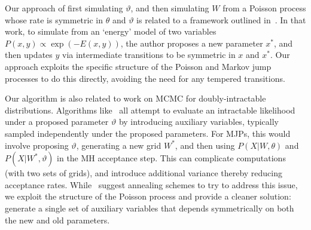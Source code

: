 Our approach of first simulating $\vartheta$, and then simulating $W$ from a Poisson process whose rate is symmetric in $\theta$ and $\vartheta$ is related to a framework outlined in~\citet{Neal04Drag}. In that work, to simulate from an `energy' model of two variables $P(x,y) \propto \exp(-E(x,y))$, the author proposes a new parameter $x^*$, and then updates $y$ via intermediate transitions to be symmetric in $x$ and $x^*$. Our approach exploits the specific structure of the Poisson and Markov jump processes to do this directly, avoiding the need for any tempered transitions. 

Our algorithm is also related to work on MCMC for doubly-intractable distributions.  Algorithms like~\cite{Moller2006,murray2006,Andrieu09} all attempt to evaluate an intractable likelihood under a proposed parameter $\vartheta$ by introducing auxiliary variables, typically sampled independently under the proposed parameters. 
For MJPs, this would involve proposing $\vartheta$, generating a new grid $W^*$, and then using $P(X|W,\theta)$ and $P(X|W^*,\vartheta)$ in the MH acceptance step. 
This can complicate computations (with two sets of grids), and introduce additional variance thereby reducing acceptance rates. %
While~\cite{murray2006} suggest annealing schemes to try to address this issue, we exploit the structure of the Poisson process and provide a cleaner solution: generate a single set of auxiliary variables that depends symmetrically on both the new and old parameters. 
